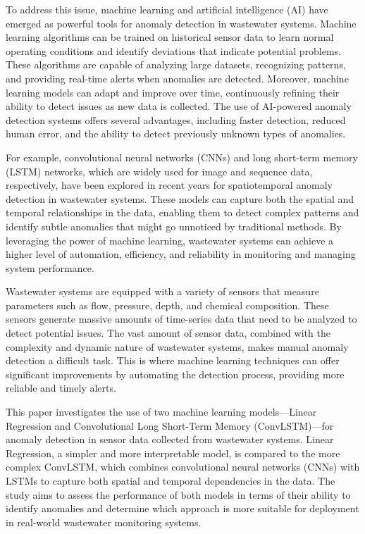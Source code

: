 \documentclass[conference]{IEEEtran}
\begin{document}
To address this issue, machine learning and artificial intelligence (AI) have emerged as powerful tools for anomaly detection in wastewater systems. Machine learning algorithms can be trained on historical sensor data to learn normal operating conditions and identify deviations that indicate potential problems. These algorithms are capable of analyzing large datasets, recognizing patterns, and providing real-time alerts when anomalies are detected. Moreover, machine learning models can adapt and improve over time, continuously refining their ability to detect issues as new data is collected. The use of AI-powered anomaly detection systems offers several advantages, including faster detection, reduced human error, and the ability to detect previously unknown types of anomalies.

For example, convolutional neural networks (CNNs) and long short-term memory (LSTM) networks, which are widely used for image and sequence data, respectively, have been explored in recent years for spatiotemporal anomaly detection in wastewater systems. These models can capture both the spatial and temporal relationships in the data, enabling them to detect complex patterns and identify subtle anomalies that might go unnoticed by traditional methods. By leveraging the power of machine learning, wastewater systems can achieve a higher level of automation, efficiency, and reliability in monitoring and managing system performance.

Wastewater systems are equipped with a variety of sensors that measure parameters such as flow, pressure, depth, and chemical composition. These sensors generate massive amounts of time-series data that need to be analyzed to detect potential issues. The vast amount of sensor data, combined with the complexity and dynamic nature of wastewater systems, makes manual anomaly detection a difficult task. This is where machine learning techniques can offer significant improvements by automating the detection process, providing more reliable and timely alerts.

This paper investigates the use of two machine learning models—Linear Regression and Convolutional Long Short-Term Memory (ConvLSTM)—for anomaly detection in sensor data collected from wastewater systems. Linear Regression, a simpler and more interpretable model, is compared to the more complex ConvLSTM, which combines convolutional neural networks (CNNs) with LSTMs to capture both spatial and temporal dependencies in the data. The study aims to assess the performance of both models in terms of their ability to identify anomalies and determine which approach is more suitable for deployment in real-world wastewater monitoring systems.
\end{document}
